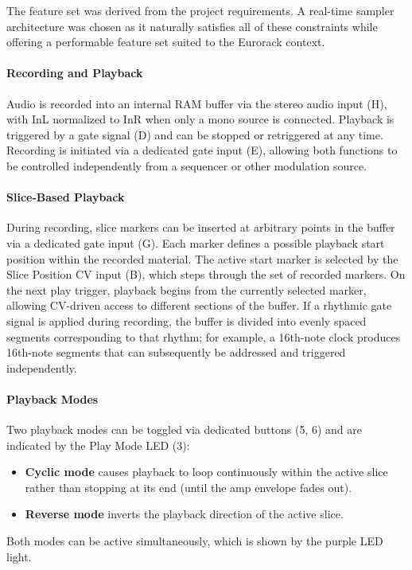 The feature set was derived from the project requirements. 
A real-time sampler architecture was chosen as it naturally satisfies all of these constraints while offering a performable feature set suited to the Eurorack context.

\paragraph{Recording and Playback}
Audio is recorded into an internal RAM buffer via the stereo audio input (H), with InL normalized to InR when only a mono source is connected. 
Playback is triggered by a gate signal (D) and can be stopped or retriggered at any time.
Recording is initiated via a dedicated gate input (E), allowing both functions to be controlled independently from a sequencer or other modulation source.

\paragraph{Slice-Based Playback}
During recording, slice markers can be inserted at arbitrary points in the buffer via a dedicated gate input (G). 
Each marker defines a possible playback start position within the recorded material. 
The active start marker is selected by the Slice Position CV input (B), which steps through the set of recorded markers. 
On the next play trigger, playback begins from the currently selected marker, allowing CV-driven access to different sections of the buffer.
If a rhythmic gate signal is applied during recording, the buffer is divided into evenly spaced segments corresponding to that rhythm; for example, a 16th-note clock produces 16th-note segments that can subsequently be addressed and triggered independently.

\paragraph{Playback Modes}
Two playback modes can be toggled via dedicated buttons (5, 6) and are indicated by the Play Mode LED (3):
\begin{itemize}
    \item \textbf{Cyclic mode} causes playback to loop continuously within
    the active slice rather than stopping at its end (until the amp envelope fades out).
    \item \textbf{Reverse mode} inverts the playback direction of the active
    slice.
\end{itemize}
Both modes can be active simultaneously, which is shown by the purple LED light.

